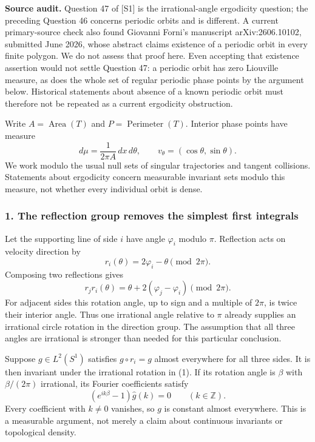 \documentclass[11pt]{article}
\begin{document}
\textbf{Source audit.} Question 47 of [S1] is the irrational-angle ergodicity question; the preceding Question 46 concerns periodic orbits and is different. A current primary-source check also found Giovanni Forni's manuscript arXiv:2606.10102, submitted June 2026, whose abstract claims existence of a periodic orbit in every finite polygon. We do not assess that proof here. Even accepting that existence assertion would not settle Question 47: a periodic orbit has zero Liouville measure, as does the whole set of regular periodic phase points by the argument below. Historical statements about absence of a known periodic orbit must therefore not be repeated as a current ergodicity obstruction.

Write $A=\operatorname{Area}(T)$ and $P=\operatorname{Perimeter}(T)$. Interior phase points have measure
\[
 d\mu=\frac1{2\pi A}\,dx\,d\theta,
 \qquad v_\theta=(\cos\theta,\sin\theta).
\]
We work modulo the usual null sets of singular trajectories and tangent collisions. Statements about ergodicity concern measurable invariant sets modulo this measure, not whether every individual orbit is dense.

\subsubsection{1. The reflection group removes the simplest first integrals}
Let the supporting line of side $i$ have angle $\varphi_i$ modulo $\pi$. Reflection acts on velocity direction by
\[
 r_i(\theta)=2\varphi_i-\theta\pmod{2\pi}.
\]
Composing two reflections gives
\[
 r_jr_i(\theta)=\theta+2(\varphi_j-\varphi_i)\pmod{2\pi}.
                                                               \tag{1}
\]
For adjacent sides this rotation angle, up to sign and a multiple of $2\pi$, is twice their interior angle. Thus one irrational angle relative to $\pi$ already supplies an irrational circle rotation in the direction group. The assumption that all three angles are irrational is stronger than needed for this particular conclusion.

Suppose $g\in L^2(S^1)$ satisfies $g\circ r_i=g$ almost everywhere for all three sides. It is then invariant under the irrational rotation in (1). If its rotation angle is $\beta$ with $\beta/(2\pi)$ irrational, its Fourier coefficients satisfy
\[
 (e^{ik\beta}-1)\widehat g(k)=0\qquad(k\in\mathbb Z).
\]
Every coefficient with $k\ne0$ vanishes, so $g$ is constant almost everywhere. This is a measurable argument, not merely a claim about continuous invariants or topological density.
\end{document}
